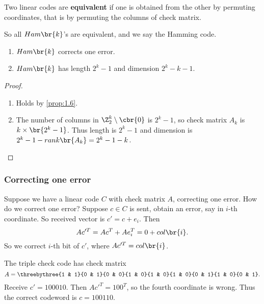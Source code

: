 \setcounter{MaxMatrixCols}{10}

\begin{definition*}
Two linear codes are \textbf{equivalent} if one is obtained from the other by permuting coordinates, that is by permuting the columns of check matrix.
\end{definition*}

So all $ Ham\br{k} $'s are equivalent, and we say the Hamming code.

\begin{proposition}
\label{prop:1.7}
\hfill
\begin{enumerate}
\item $ Ham\br{k} $ corrects one error.
\item $ Ham\br{k} $ has length $ 2^k - 1 $ and dimension $ 2^k - k - 1 $.
\end{enumerate}
\end{proposition}

\begin{proof}
\hfill
\begin{enumerate}
\item Holds by \ref{prop:1.6}.
\item The number of columns in $ \Z_2^k \setminus \cbr{0} $ is $ 2^k - 1 $, so check matrix $ A_k $ is $ k \times \br{2^k - 1} $. Thus length is $ 2^k - 1 $ and dimension is $ 2^k - 1 - rank\br{A_k} = 2^k - 1 - k $.
\end{enumerate}
\end{proof}

\subsubsection{Correcting one error}

Suppose we have a linear code $ C $ with check matrix $ A $, correcting one error. How do we correct one error? Suppose $ c \in C $ is sent, obtain an error, say in $ i $-th coordinate. So received vector is $ c' = c + e_i $. Then
$$ Ac'^T = Ac^T + Ae_i^T = 0 + col\br{i}. $$
So we correct $ i $-th bit of $ c' $, where $ Ac'^T = col\br{i} $.

\begin{example*}
The triple check code has check matrix
$$ A = \threebythree{1 & 1}{0 & 1}{0 & 0}{1 & 0}{1 & 0}{1 & 0}{0 & 1}{1 & 0}{0 & 1}. $$
Receive $ c' = 100010 $. Then $ Ac'^T = 100^T $, so the fourth coordinate is wrong. Thus the correct codeword is $ c = 100110 $.
\end{example*}

